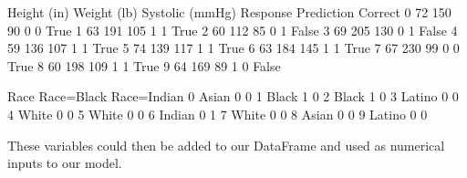 \documentclass[letterpaper,10pt,english]{sphinxmanual}
\begin{document}
\begin{sphinxVerbatim}[commandchars=\\\{\}]
   Height (in)  Weight (lb)  Systolic (mmHg)  Response  Prediction  Correct  \PYGZbs{}
0           72          150               90         0           0     True   
1           63          191              105         1           1     True   
2           60          112               85         0           1    False   
3           69          205              130         0           1    False   
4           59          136              107         1           1     True   
5           74          139              117         1           1     True   
6           63          184              145         1           1     True   
7           67          230               99         0           0     True   
8           60          198              109         1           1     True   
9           64          169               89         1           0    False   

     Race  Race=Black  Race=Indian  
0   Asian           0            0  
1   Black           1            0  
2   Black           1            0  
3  Latino           0            0  
4   White           0            0  
5   White           0            0  
6  Indian           0            1  
7   White           0            0  
8   Asian           0            0  
9  Latino           0            0  
\end{sphinxVerbatim}

These variables could then be added to our  DataFrame and used as numerical inputs to our model.

\begin{sphinxVerbatim}[commandchars=\\\{\}]
    
\PYG{p}{[}\PYG{p}{]}  \PYG{p}{[}\PYG{p}{]}
\PYG{p}{[}\PYG{p}{]}  \PYG{p}{[}\PYG{p}{]}
\end{sphinxVerbatim}
\end{document}
